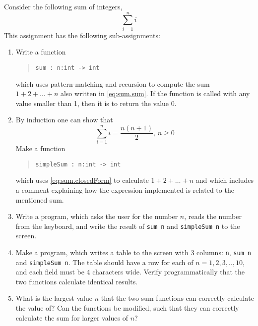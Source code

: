 Consider the following sum of integers,
\begin{equation}
  \sum_{i=1}^n i
  \label{eq:sum.sum}
\end{equation}
This assignment has the following sub-assignments:
\begin{enumerate}
\item \label{sum} Write a function
  \begin{quote}
    \mbox{\lstinline!sum : n:int -> int!}
  \end{quote}
  which uses pattern-matching and recursion to compute the sum $1 + 2 + \dots + n$
  also written in \eqref{eq:sum.sum}. If the function is called with any value smaller than 1, then it is to return the value 0.
\item By induction one can show that
  \begin{equation}
    \sum_{i=1}^n i = \frac{n(n+1)}{2},\, n\geq 0
    \label{eq:sum.closedForm}
  \end{equation}
  Make a function
  \begin{quote}
    \mbox{\lstinline!simpleSum : n:int -> int!}
  \end{quote}
  which uses \eqref{eq:sum.closedForm} to calculate $1 + 2 + \dots + n$ and which includes a comment explaining how the expression implemented is related to the mentioned sum.
\item Write a program, which asks the user for the number $n$, reads the number from the keyboard, and write the result of \lstinline{sum n} and \lstinline!simpleSum n! to the screen.
\item Make a program, which writes a table to the screen with 3
  columns: \lstinline!n!, \lstinline!sum n! and
  \mbox{\lstinline!simpleSum n!}. The table should have a row for each
  of $n=1,2,3,..,10$, and each field must be 4 characters wide. Verify programmatically that the two functions calculate
  identical results.
\item What is the largest value $n$ that the two sum-functions can
  correctly calculate the value of? Can the functions be modified,
  such that they can correctly calculate the sum for larger values of
  $n$?
  \end{enumerate}
